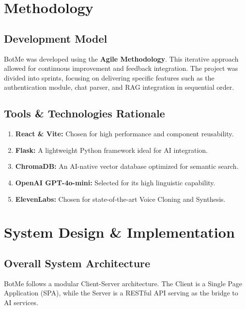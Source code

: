 \documentclass[12pt,a4paper]{report}
\begin{document}
\chapter{Methodology}

\section{Development Model}
BotMe was developed using the \textbf{Agile Methodology}. This iterative approach allowed for continuous improvement and feedback integration. The project was divided into sprints, focusing on delivering specific features such as the authentication module, chat parser, and RAG integration in sequential order.

\section{Tools \& Technologies Rationale}
\begin{enumerate}
    \item \textbf{React \& Vite:} Chosen for high performance and component reusability.
    \item \textbf{Flask:} A lightweight Python framework ideal for AI integration.
    \item \textbf{ChromaDB:} An AI-native vector database optimized for semantic search.
    \item \textbf{OpenAI GPT-4o-mini:} Selected for its high linguistic capability.
    \item \textbf{ElevenLabs:} Chosen for state-of-the-art Voice Cloning and Synthesis.
\end{enumerate}

\chapter{System Design \& Implementation}

\section{Overall System Architecture}
BotMe follows a modular Client-Server architecture. The Client is a Single Page Application (SPA), while the Server is a RESTful API serving as the bridge to AI services.
\end{document}

